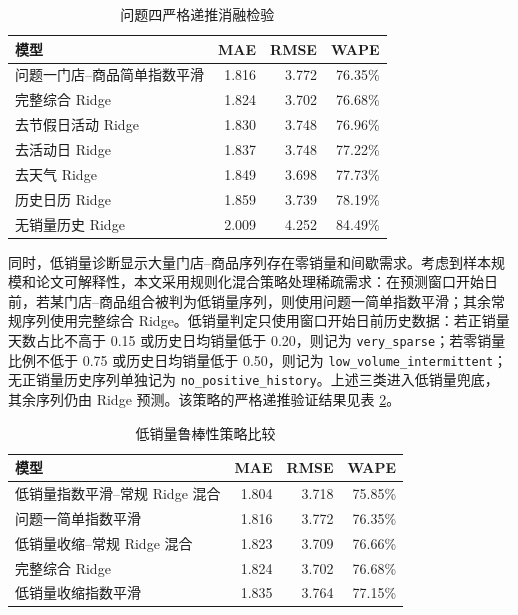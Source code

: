 \begin{table}[H]
\centering
\caption{问题四严格递推消融检验}
\label{tab:q4_ablation}
\begin{tabular}{lrrr}
\toprule
模型 & MAE & RMSE & WAPE \\
\midrule
问题一门店--商品简单指数平滑 & 1.816 & 3.772 & 76.35\% \\
完整综合 Ridge & 1.824 & 3.702 & 76.68\% \\
去节假日活动 Ridge & 1.830 & 3.748 & 76.96\% \\
去活动日 Ridge & 1.837 & 3.748 & 77.22\% \\
去天气 Ridge & 1.849 & 3.698 & 77.73\% \\
历史日历 Ridge & 1.859 & 3.739 & 78.19\% \\
无销量历史 Ridge & 2.009 & 4.252 & 84.49\% \\
\bottomrule
\end{tabular}
\end{table}

同时，低销量诊断显示大量门店--商品序列存在零销量和间歇需求。考虑到样本规模和论文可解释性，本文采用规则化混合策略处理稀疏需求：在预测窗口开始日前，若某门店--商品组合被判为低销量序列，则使用问题一简单指数平滑；其余常规序列使用完整综合 Ridge。低销量判定只使用窗口开始日前历史数据：若正销量天数占比不高于 0.15 或历史日均销量低于 0.20，则记为 \texttt{very\_sparse}；若零销量比例不低于 0.75 或历史日均销量低于 0.50，则记为 \texttt{low\_volume\_intermittent}；无正销量历史序列单独记为 \texttt{no\_positive\_history}。上述三类进入低销量兜底，其余序列仍由 Ridge 预测。该策略的严格递推验证结果见表 \ref{tab:q4_low_volume_strategy}。

\begin{table}[H]
\centering
\caption{低销量鲁棒性策略比较}
\label{tab:q4_low_volume_strategy}
\begin{tabular}{lrrr}
\toprule
模型 & MAE & RMSE & WAPE \\
\midrule
低销量指数平滑--常规 Ridge 混合 & 1.804 & 3.718 & 75.85\% \\
问题一简单指数平滑 & 1.816 & 3.772 & 76.35\% \\
低销量收缩--常规 Ridge 混合 & 1.823 & 3.709 & 76.66\% \\
完整综合 Ridge & 1.824 & 3.702 & 76.68\% \\
低销量收缩指数平滑 & 1.835 & 3.764 & 77.15\% \\
\bottomrule
\end{tabular}
\end{table}

